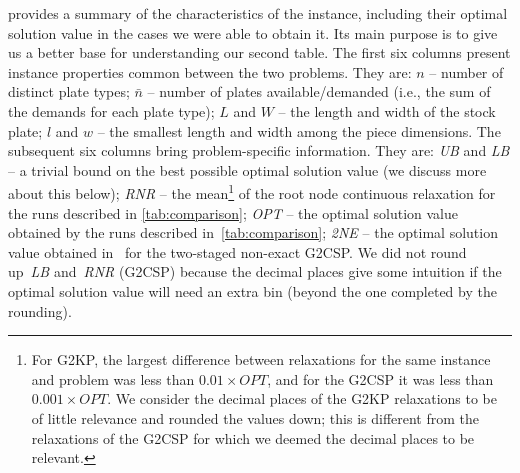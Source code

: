 \documentclass[9pt]{entcs}
\begin{document}
 provides a summary of the characteristics of the instance, including their optimal solution value in the cases we were able to obtain it.
Its main purpose is to give us a better base for understanding our second table.
The first six columns present instance properties common between the two problems.
They are:
\(n\) -- number of distinct plate types;
\(\bar{n}\) -- number of plates available/demanded (i.e., the sum of the demands for each plate type);
\(L\) and \(W\) -- the length and width of the stock plate;
\underline{\(l\)} and \underline{\(w\)} -- the smallest length and width among the piece dimensions.
The subsequent six columns bring problem-specific information.
They are:
\emph{UB} and \emph{LB} -- a trivial bound on the best possible optimal solution value (we discuss more about this below);
\emph{RNR} -- the mean\footnote{
	For G2KP, the largest difference between relaxations for the same instance and problem was less than \(0.01 \times OPT\), and for the G2CSP it was less than \(0.001 \times OPT\).
	We consider the decimal places of the G2KP relaxations to be of little relevance and rounded the values down; this is different from the relaxations of the G2CSP for which we deemed the decimal places to be relevant.
} of the root node continuous relaxation for the runs described in \cref{tab:comparison};
\emph{OPT} -- the optimal solution value obtained by the runs described in~\cref{tab:comparison};
\emph{2NE} -- the optimal solution value obtained in~\cite{silva:2010} for the two-staged non-exact G2CSP.
We did not round up~\emph{LB} and~\emph{RNR} (G2CSP) because the decimal places give some intuition if the optimal solution value will need an extra bin (beyond the one completed by the rounding).
\end{document}
